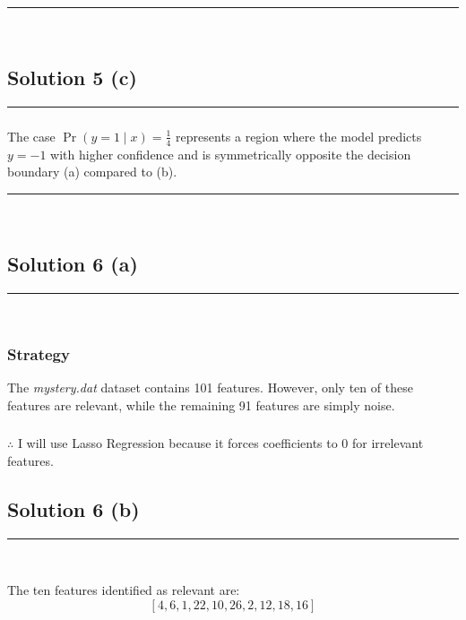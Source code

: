 \documentclass{article}
\begin{document}
\noindent\rule{\textwidth}{0.4pt}\\

\newpage

\subsection*{Solution 5 (c)}
\noindent\rule{\textwidth}{0.4pt}

\subsubsection*{}

\parbox{\textwidth}{
The case $\operatorname{Pr}(y=1 \mid x) = \frac{1}{4}$ represents a region where the model predicts $y=-1$ with higher confidence and is symmetrically opposite the decision boundary (a) compared to (b).
}
\noindent\rule{\textwidth}{0.4pt}\\

\newpage
\subsection*{Solution 6 (a)}
\noindent\rule{\textwidth}{0.4pt}\\

\subsubsection*{Strategy}
\parbox{\textwidth}{
  The \textit{mystery.dat} dataset contains 101 features. However, only ten of these features are relevant, while the remaining 91 features are simply noise.
}

\subsubsection*{\normalfont}{$\therefore$ I will use Lasso Regression because it forces coefficients to 0 for irrelevant features.}


\newpage

\subsection*{Solution 6 (b)}
\noindent\rule{\textwidth}{0.4pt}\\

\parbox{\textwidth}{
The ten features identified as relevant are:
\[
[4, 6, 1, 22, 10, 26, 2, 12, 18, 16]
\]
}
\end{document}
